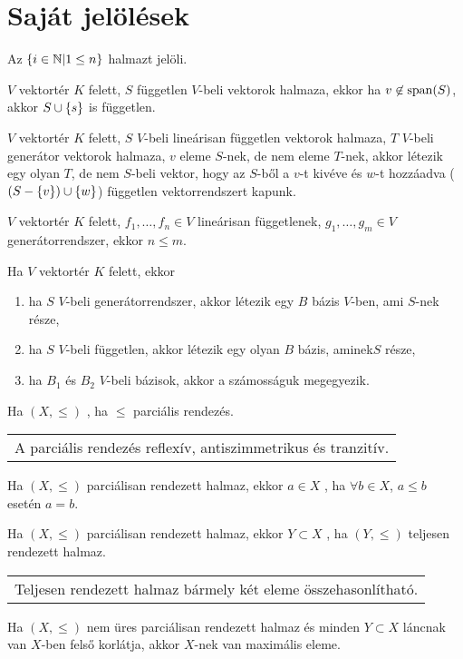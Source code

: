 \documentclass{article}
\title{}
\author{}
\newenvironment{megj}
	{\begin{center}

	\begin{tabular}{||p{0.9\textwidth}}
	}
	{ 
	\end{tabular} 
	\end{center}
	}
\DeclarePairedDelimiter{\hz}{\{}{\}}
\begin{document}
\section{Saját jelölések}
	\begin{jel}
		Az $\hz{i\in\mathbb{N}|1\leq n}$ halmazt  jelöli.
	\end{jel}
	\begin{tet}
		$V$ vektortér $K$ felett, $S$ független $V$-beli vektorok halmaza,
		ekkor ha $v\not\in\operatorname{span}(S)$, akkor $S\cup\hz{s}$ is független.
	\end{tet}
	\begin{mm}
		$V$ vektortér $K$ felett, $S$ $V$-beli lineárisan független vektorok
		halmaza, $T$ $V$-beli generátor vektorok halmaza, $v$ eleme $S$-nek, de nem
		eleme $T$-nek, akkor létezik egy olyan $T$, de nem $S$-beli vektor, hogy az
		$S$-ből a $v$-t kivéve és $w$-t hozzáadva ($(S-\hz{v})\cup\hz{w}$) független
		vektorrendszert kapunk.
	\end{mm}
	\begin{mm}
		$V$ vektortér $K$ felett, $f_1,\ldots,f_n\in V$ lineárisan függetlenek,
		$g_1,\ldots,g_m\in V$ generátorrendszer, ekkor $n\leq m$.
	\end{mm}
	\begin{tet}
		Ha $V$ vektortér $K$ felett, ekkor
		\begin{enumerate}
			\item ha $S$ $V$-beli generátorrendszer, akkor létezik egy $B$ bázis
				$V$-ben, ami $S$-nek része,
			\item ha $S$ $V$-beli független, akkor létezik egy olyan $B$ bázis,
				aminek$S$ része,
			\item ha $B_1$ és $B_2$ $V$-beli bázisok, akkor a számosságuk megegyezik.
		\end{enumerate}
	\end{tet}
	\begin{ff}
		Ha $(X,\leq)$ , ha $\leq$ parciális
		rendezés.
	\end{ff}
	\begin{megj}
		A parciális rendezés reflexív, antiszimmetrikus és tranzitív.
	\end{megj}
	\begin{ff}
		Ha $(X,\leq)$ parciálisan rendezett halmaz, ekkor $a\in X$
		, ha $\forall b\in X$, $a\leq b$ esetén $a=b$.
	\end{ff}
	\begin{ff}
		Ha $(X,\leq)$ parciálisan rendezett halmaz, ekkor $Y\subset X$ \deff{lánc},
		ha $(Y,\leq)$ teljesen rendezett halmaz.
	\end{ff}
	\begin{megj}
		Teljesen rendezett halmaz bármely két eleme összehasonlítható.
	\end{megj}
	\begin{mm}[Zorn]
		Ha $(X,\leq)$ nem üres parciálisan rendezett halmaz és minden $Y\subset
		X$ láncnak van $X$-ben felső korlátja, akkor $X$-nek van maximális
		eleme.
	\end{mm}
\end{document}
